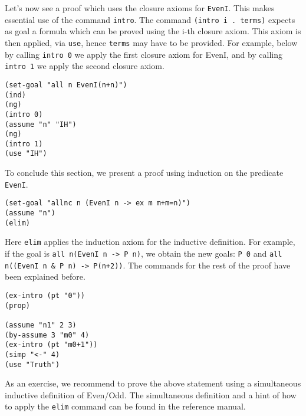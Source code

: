 \documentclass[12pt]{amsart}
\begin{document}
Let's now see a proof which uses the closure axioms for
\texttt{EvenI}.  This makes essential use of the command
\texttt{intro}.  The command \texttt{(intro i .\ terms)} expects as
goal a formula which can be proved using the i-th closure axiom.  This
axiom is then applied, via \texttt{use}, hence \texttt{terms} may have
to be provided.  For example, below by calling \texttt{intro 0} we
apply the first closure axiom for EvenI, and by calling \texttt{intro
  1} we apply the second closure axiom.
\begin{verbatim}
(set-goal "all n EvenI(n+n)")
(ind)
(ng)
(intro 0)
(assume "n" "IH")
(ng)
(intro 1)
(use "IH")
\end{verbatim}

To conclude this section, we present a proof using induction on the
predicate \texttt{EvenI}.
\begin{verbatim}
(set-goal "allnc n (EvenI n -> ex m m+m=n)")
(assume "n")
(elim)
\end{verbatim}

Here \texttt{elim} applies the induction axiom for the inductive
definition.  For example, if the goal is \texttt{all n(EvenI n -> P
  n)}, we obtain the new goals: \texttt{P 0} and \texttt{all n((EvenI
  n \& P n) -> P(n+2))}.  The commands for the rest of the proof have
been explained before.
\begin{verbatim}
(ex-intro (pt "0"))
(prop)

(assume "n1" 2 3)
(by-assume 3 "m0" 4)
(ex-intro (pt "m0+1"))
(simp "<-" 4)
(use "Truth")
\end{verbatim}

As an exercise, we recommend to prove the above statement using a
simultaneous inductive definition of Even/Odd.  The simultaneous
definition and a hint of how to apply the \verb|elim| command can be
found in the reference manual.
\end{document}
